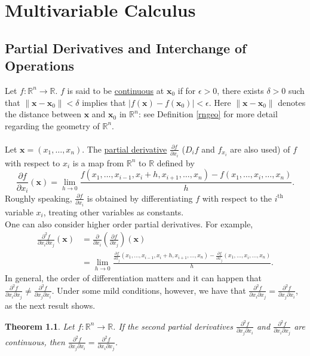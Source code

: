 \documentclass[12pt,letterpaper]{book}
\numberwithin{equation}{section}
\newtheorem{thm}{\textbf{Theorem}}[section]
\theoremstyle{definition}
\begin{document}
\chapter{Multivariable Calculus} 

\section{Partial Derivatives and Interchange of Operations}

Let $f:\mathbb{R}^n\to \mathbb{R}$. $f$ is said to be \underline{continuous} at $\bm{x}_0$ if for $\epsilon>0$, there exists $\delta>0$ such that $\|\bm{x}-\bm{x}_0\|<\delta$ implies that $|f(\bm{x})-f(\bm{x}_0)|<\epsilon$. Here $\|\bm{x}-\bm{x}_0\|$ denotes the distance between $\bm{x}$ and $\bm{x}_0$ in $\mathbb{R}^n$: see Definition \ref{rngeo} for more detail regarding the geometry of $\mathbb{R}^n$. \\\\
Let $\bm{x}=(x_1,\ldots,x_n)$. The \underline{partial derivative} $\frac{\partial f}{\partial x_i}$ ($D_i f$ and $f_{x_i}$ are also used) of $f$ with respect to $x_i$ is a map from $\mathbb{R}^n$ to $\mathbb{R}$ defined by
$$\frac{\partial f}{\partial x_i}(\bm{x})=\lim_{h\to 0}\frac{f(x_1,\ldots,x_{i-1},x_i+h,x_{i+1},\ldots,x_n)-f(x_1,\ldots,x_i,\ldots,x_n)}{h}.$$
Roughly speaking, $\frac{\partial f}{\partial x_i}$ is obtained by differentiating $f$ with respect to the $i^{\text{th}}$ variable $x_i$, treating other variables as constants.\\
One can also consider higher order partial derivatives. For example,
\begin{align*}\frac{\partial^2 f}{\partial x_i\partial x_j}(\bm{x})&=\frac{\partial}{\partial x_i}\left(\frac{\partial f}{\partial x_j}\right)(\bm{x})\\
&=\lim_{h\to 0}\frac{\frac{\partial f}{\partial x_j}(x_1,\ldots,x_{i-1},x_i+h,x_{i+1},\ldots,x_n)-\frac{\partial f}{\partial x_j}(x_1,\ldots,x_i,\ldots,x_n)}{h}.\end{align*}
In general, the order of differentiation matters and it can happen that $\frac{\partial^2 f}{\partial x_i\partial x_j}\neq \frac{\partial^2 f}{\partial x_j\partial x_i}$. Under some mild conditions, however, we have that $\frac{\partial^2 f}{\partial x_i\partial x_j}= \frac{\partial^2 f}{\partial x_j\partial x_i}$, as the next result shows.

\begin{thm}\label{switch partials}
Let $f:\mathbb{R}^n\to \mathbb{R}$. If the second partial derivatives $\frac{\partial^2 f}{\partial x_j\partial x_i}$ and $\frac{\partial^2 f}{\partial x_i\partial x_j}$ are continuous, then $\frac{\partial^2 f}{\partial x_j\partial x_i}=\frac{\partial^2 f}{\partial x_i\partial x_j}$.
\end{thm}
\end{document}
